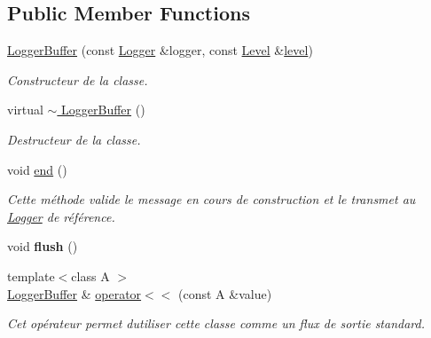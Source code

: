 \subsection*{Public Member Functions}
\begin{DoxyCompactItemize}
\item 
\hyperlink{classlogs_1_1Logger_1_1LoggerBuffer_af0693b3b740e8d5c8d09bea5ef0c8695}{Logger\+Buffer} (const \hyperlink{classlogs_1_1Logger}{Logger} \&logger, const \hyperlink{classlogs_1_1Level}{Level} \&\hyperlink{classlogs_1_1Logger_a94c013a945cf805fbbc8aa763f73f107}{level})
\begin{DoxyCompactList}\small\item\em Constructeur de la classe. \end{DoxyCompactList}\item 
\mbox{\label{classlogs_1_1Logger_1_1LoggerBuffer_ab39aa2b4513f75d101c734b8e07ac720}} 
virtual \hyperlink{classlogs_1_1Logger_1_1LoggerBuffer_ab39aa2b4513f75d101c734b8e07ac720}{$\sim$ Logger\+Buffer} ()
\begin{DoxyCompactList}\small\item\em Destructeur de la classe. \end{DoxyCompactList}\item 
\mbox{\label{classlogs_1_1Logger_1_1LoggerBuffer_a0e4fd77693fd899ec1b0670354f93a02}} 
void \hyperlink{classlogs_1_1Logger_1_1LoggerBuffer_a0e4fd77693fd899ec1b0670354f93a02}{end} ()
\begin{DoxyCompactList}\small\item\em Cette méthode valide le message en cours de construction et le transmet au \hyperlink{classlogs_1_1Logger}{Logger} de référence. \end{DoxyCompactList}\item 
\mbox{\label{classlogs_1_1Logger_1_1LoggerBuffer_aee16dd078779a8154f1b3d7238748a6f}} 
void {\bfseries flush} ()
\item 
{\footnotesize template$<$class A $>$ }\\\hyperlink{classlogs_1_1Logger_1_1LoggerBuffer}{Logger\+Buffer} \& \hyperlink{classlogs_1_1Logger_1_1LoggerBuffer_abb331f69c4ced4db2a19140eae18c7eb}{operator$<$$<$} (const A \&value)
\begin{DoxyCompactList}\small\item\em Cet opérateur permet d\textquotesingle{}utiliser cette classe comme un flux de sortie standard. \end{DoxyCompactList}\item 

\end{DoxyCompactItemize}
